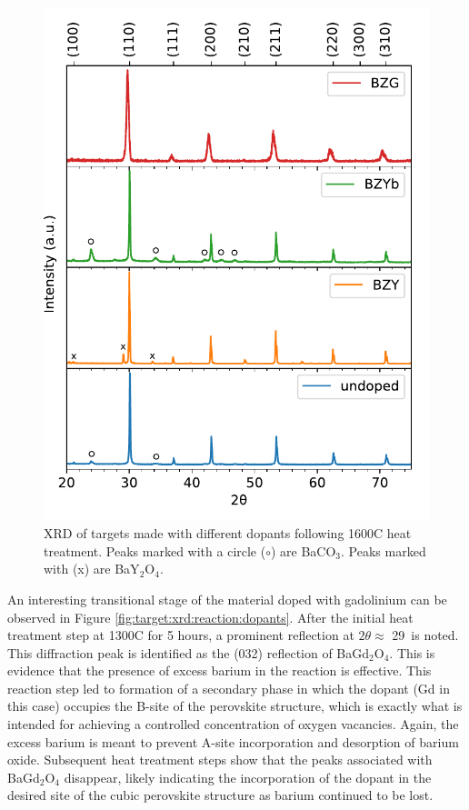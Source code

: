 \begin{figure}
    \centering
    \includegraphics{Figures/190219-xrd-pure-y-yb-gd-pellet-comparison-edit-2.pdf}
    \caption{XRD of targets made with different dopants following 1600\textdegree C heat treatment. Peaks marked with a circle ($\circ$) are BaCO$_3$. Peaks marked with (x) are BaY$_2$O$_4$.}
    \label{fig:target:xrd:allTargetComparison}
\end{figure}

An interesting transitional stage of the material doped with gadolinium can be observed in Figure \ref{fig:target:xrd:reaction:dopants}. After the initial heat treatment step at 1300\textdegree C for 5 hours, a prominent reflection at $2\theta \approx$ 29\textdegree$\,$  is noted. This diffraction peak is identified as the (032) reflection of BaGd$_2$O$_4$. This is evidence that the presence of excess barium in the reaction is effective. This reaction step led to formation of a secondary phase in which the dopant (Gd in this case) occupies the B-site of the perovskite structure, which is exactly what is intended for achieving a controlled concentration of oxygen vacancies. Again, the excess barium is meant to prevent A-site incorporation and desorption of barium oxide. Subsequent heat treatment steps show that the peaks associated with BaGd$_2$O$_4$ disappear, likely indicating the incorporation of the dopant in the desired site of the cubic perovskite structure as barium continued to be lost.

